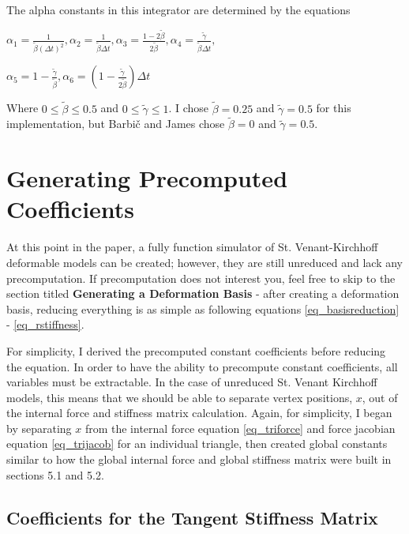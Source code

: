 \documentclass[twocolumn,10pt]{asme2ej}
\begin{document}
The alpha constants in this integrator are determined by the equations

\begin{center}
$\alpha_1 = \frac{1}{\tilde{\beta}(\Delta t)^2}, \alpha_2 = \frac{1}{\tilde{\beta}\Delta t},
\alpha_3 = \frac{1 - 2\tilde{\beta}}{2\tilde{\beta}}, \alpha_4 = \frac{\tilde{\gamma}}{\tilde{\beta}\Delta t},$

$\alpha_5 = 1 - \frac{\tilde{\gamma}}{\tilde{\beta}}, \alpha_6 = (1 - \frac{\tilde{\gamma}}{2\tilde{\beta}})\Delta t$
\end{center}

Where $0 \leq \tilde{\beta} \leq 0.5$ and $0 \leq \tilde{\gamma} \leq 1$. I chose $\tilde{\beta} = 0.25$ and $\tilde{\gamma} = 0.5$ for this implementation, but Barbič and James chose $\tilde{\beta} = 0$ and $\tilde{\gamma} = 0.5$.

\section{Generating Precomputed Coefficients}

At this point in the paper, a fully function simulator of St. Venant-Kirchhoff deformable models can be created; however, they are still unreduced and lack any precomputation. If precomputation does not interest you, feel free to skip to the section titled \textbf{Generating a Deformation Basis} - after creating a deformation basis, reducing everything is as simple as following equations \ref{eq_basisreduction} - \ref{eq_rstiffness}.

For simplicity, I derived the precomputed constant coefficients before reducing the equation. In order to have the ability to precompute constant coefficients, all variables must be extractable. In the case of unreduced St. Venant Kirchhoff models, this means that we should be able to separate vertex positions, $x$, out of the internal force and stiffness matrix calculation. Again, for simplicity, I began by separating $x$ from the internal force equation \ref{eq_triforce} and force jacobian equation \ref{eq_trijacob} for an individual triangle, then created global constants similar to how the global internal force and global stiffness matrix were built in sections 5.1 and 5.2.

\subsection{Coefficients for the Tangent Stiffness Matrix}
\end{document}
